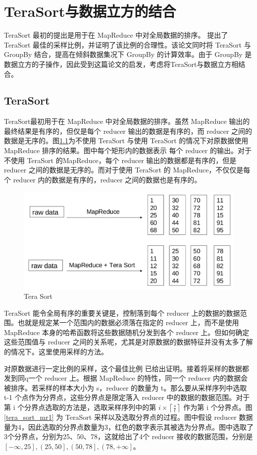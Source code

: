 \chapter{TeraSort与数据立方的结合}

TeraSort \cite{o2008terabyte} 最初的提出是用于在 MapReduce 中对全局数据的排序。\cite{tao2013minimal} 提出了 TeraSort 最佳的采样比例，并证明了该比例的合理性。该论文同时将 TeraSort 与 GroupBy 结合，提高在倾斜数据集况下 GroupBy 的计算效率。由于 GroupBy 是数据立方的子操作，因此受到这篇论文的启发，考虑将TeraSort与数据立方相结合。

\section{TeraSort}

TeraSort最初用于在 MapReduce 中对全局数据的排序。虽然 MapReduce 输出的最终结果是有序的，但仅是每个 reducer 输出的数据是有序的，而 reducer 之间的数据是无序的。图\ref{tera_sort}为不使用 TeraSort 与使用 TeraSort 的情况下对原数据使用 MapReduce 排序的结果。图中每个矩形内的数据表示 每个 reducer 的输出。对于不使用 TeraSort 的MapReduce，每个 reducer 输出的数据都是有序的，但是reducer 之间的数据是无序的。而对于使用 TeraSort 的 MapReduce，不仅仅是每个 reducer 内的数据是有序的，reducer 之间的数据也是有序的。

\begin{figure}[ht] 
\centering\includegraphics[width=4.5in]{picture/ch_terasort_mr/tera_sort} 
\caption{Tera Sort}\label{tera_sort} 
\end{figure}

TeraSort 能令全局有序的重要关键是，控制落到每个 reducer 上的数据的数据范围。也就是规定某一个范围内的数据必须落在指定的 reducer 上，而不是使用 MapReduce 本身的哈希函数将这些数据随机分发到各个 reducer 上。但如何确定这些范围值与 reducer 之间的关系呢，尤其是对原数据的数据特征并没有太多了解的情况下。这里使用采样的方法。

对原数据进行一定比例的采样，这个最佳比例 \cite{tao2013minimal} 已给出证明。接着将采样的数据都发到同q一个 reducer 上。根据 MapReduce 的特性，同一个 reducer 内的数据会被排序。若采样的样本大小为 s，reducer 的数量为 t。那么要从采样序列中选取 t-1 个点作为分界点，这些分界点是限定落入 reducer 中的数据的数据范围。对于第 i 个分界点选取的方法是，选取采样序列中的第 $i\times \left \lceil \frac{s}{t} \right \rceil$ 作为第 i 个分界点。图 \ref{tera_sort_mr1} 为  TeraSort 采样以及选取分界点的过程。图中假设 reducer 数据量为4，因此选取的分界点数量为3，红色的数字表示其被选为分界点。图中选取了3个分界点，分别为25、50、78，这就给出了4个 reducer 接收的数据范围，分别是$\left[- \infty, 25 \right], \left(25, 50 \right], \left(50, 78 \right], \left(78, +\infty \right]$。

